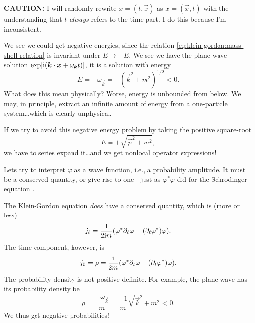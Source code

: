\begin{ddanger}
\textbf{CAUTION:}
I will randomly rewrite $x=(t,\vec{x})$ as $x=(\vec{x},t)$ with the
understanding that $t$ \emph{always} refers to the time part. I do this
because I'm inconsistent.
\end{ddanger}

We see we could get negative energies, since the relation
\eqref{eq:klein-gordon:mass-shell-relation} is invariant under
$E\to-E$. We see we have the plane wave solution
$\exp[\I(\vec{k}\cdot\vec{x}+\omega_{\vec{k}}{t})]$, it is a solution with energy
\begin{equation}
E = -\omega_{\vec{k}} = -(\vec{k}^{2}+m^{2})^{1/2} < 0.
\end{equation}
What does this mean physically? Worse, energy is unbounded from
below. We may, in principle, extract an infinite amount of energy from a
one-particle system\dots which is clearly unphysical.

If we try to avoid this negative energy problem by taking the positive
square-root
\begin{equation}
E=+\sqrt{\vec{p}^{2}+m^{2}},
\end{equation}
we have to series expand it\dots and we get nonlocal operator
expressions!

\label{par:scalar:probabilities}
Lets try to interpret $\varphi$ as a wave function, i.e., a probability
amplitude. It must be a conserved quantity, or give rise to one---just
as $\varphi^{*}\varphi$ did for the Schrodinger equation
.

The Klein-Gordon equation \emph{does} have a conserved quantity, which
is (more or less)
\begin{equation}
j_{\ell} = \frac{1}{2\mathrm{i} m}(\varphi^{*}\partial_{\ell}\varphi-(\partial_{\ell}\varphi^{*})\varphi).
\end{equation}
The time component, however, is
\begin{equation}
j_{0} = \rho = \frac{\mathrm{i}}{2m}(\varphi^{*}\partial_{t}\varphi-(\partial_{t}\varphi^{*})\varphi).
\end{equation}
The probability density is not positive-definite. For example, the
plane wave has its probability density be
\begin{equation}
\rho=\frac{-\omega_{\vec{k}}}{m}=\frac{-1}{m}\sqrt{\vec{k}^{2}+m^{2}}<0.
\end{equation}
We thus get negative probabilities!

